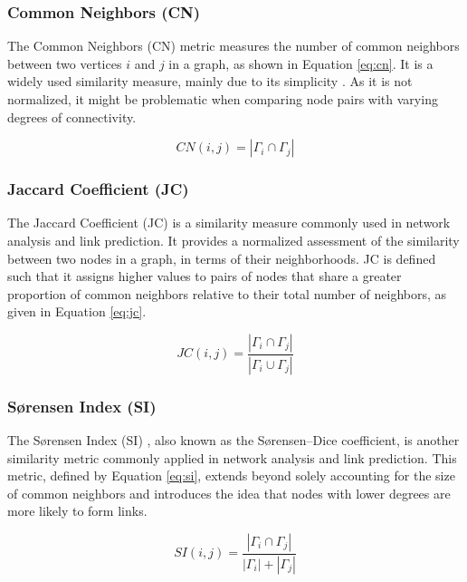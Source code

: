 \subsubsection{Common Neighbors (CN)}

The Common Neighbors (CN) metric measures the number of common neighbors between two vertices $i$ and $j$ in a graph, as shown in Equation \ref{eq:cn}. It is a widely used similarity measure, mainly due to its simplicity \cite{newman2001clustering}. As it is not normalized, it might be problematic when comparing node pairs with varying degrees of connectivity.

\begin{equation}
\label{eq:cn}
  CN(i, j) = |\Gamma_i \cap \Gamma_j|
\end{equation}


\subsubsection{Jaccard Coefficient (JC)}

The Jaccard Coefficient (JC) \cite{jaccard1901etude} is a similarity measure commonly used in network analysis and link prediction. It provides a normalized assessment of the similarity between two nodes in a graph, in terms of their neighborhoods. JC is defined such that it assigns higher values to pairs of nodes that share a greater proportion of common neighbors relative to their total number of neighbors, as given in Equation \ref{eq:jc}.

\begin{equation}
\label{eq:jc}
  JC(i, j) = \frac{|\Gamma_i \cap \Gamma_j|}{|\Gamma_i \cup \Gamma_j|}
\end{equation}


\subsubsection{S{\o}rensen Index (SI)}

The S{\o}rensen Index (SI) \cite{sorensen1948method}, also known as the S{\o}rensen–Dice coefficient, is another similarity metric commonly applied in network analysis and link prediction. This metric, defined by Equation \ref{eq:si}, extends beyond solely accounting for the size of common neighbors and introduces the idea that nodes with lower degrees are more likely to form links.

\begin{equation}
\label{eq:si}
  SI(i, j) = \frac{|\Gamma_i \cap \Gamma_j|}{|\Gamma_i| + |\Gamma_j|}
\end{equation}


